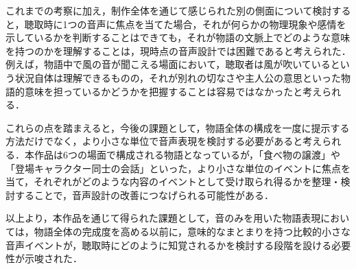 これまでの考察に加え，制作全体を通じて感じられた別の側面について検討すると，聴取時に1つの音声に焦点を当てた場合，それが何らかの物理現象や感情を示しているかを判断することはできても，それが物語の文脈上でどのような意味を持つのかを理解することは，現時点の音声設計では困難であると考えられた．例えば，物語中で風の音が聞こえる場面において，聴取者は風が吹いているという状況自体は理解できるものの，それが別れの切なさや主人公の意思といった物語的意味を担っているかどうかを把握することは容易ではなかったと考えられる．

これらの点を踏まえると，今後の課題として，物語全体の構成を一度に提示する方法だけでなく，より小さな単位で音声表現を検討する必要があると考えられる．本作品は6つの場面で構成される物語となっているが，「食べ物の譲渡」や「登場キャラクター同士の会話」といった，より小さな単位のイベントに焦点を当て，それぞれがどのような内容のイベントとして受け取られ得るかを整理・検討することで，音声設計の改善につなげられる可能性がある．

以上より，本作品を通じて得られた課題として，音のみを用いた物語表現においては，物語全体の完成度を高める以前に，意味的なまとまりを持つ比較的小さな音声イベントが，聴取時にどのように知覚されるかを検討する段階を設ける必要性が示唆された．